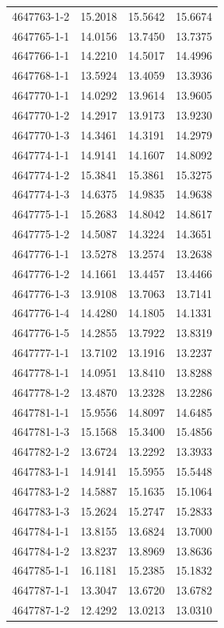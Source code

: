 \begin{longtable}{lrrr}
4647763-1-2 & 15.2018 & 15.5642 & 15.6674 \\
4647765-1-1 & 14.0156 & 13.7450 & 13.7375 \\
4647766-1-1 & 14.2210 & 14.5017 & 14.4996 \\
4647768-1-1 & 13.5924 & 13.4059 & 13.3936 \\
4647770-1-1 & 14.0292 & 13.9614 & 13.9605 \\
4647770-1-2 & 14.2917 & 13.9173 & 13.9230 \\
4647770-1-3 & 14.3461 & 14.3191 & 14.2979 \\
4647774-1-1 & 14.9141 & 14.1607 & 14.8092 \\
4647774-1-2 & 15.3841 & 15.3861 & 15.3275 \\
4647774-1-3 & 14.6375 & 14.9835 & 14.9638 \\
4647775-1-1 & 15.2683 & 14.8042 & 14.8617 \\
4647775-1-2 & 14.5087 & 14.3224 & 14.3651 \\
4647776-1-1 & 13.5278 & 13.2574 & 13.2638 \\
4647776-1-2 & 14.1661 & 13.4457 & 13.4466 \\
4647776-1-3 & 13.9108 & 13.7063 & 13.7141 \\
4647776-1-4 & 14.4280 & 14.1805 & 14.1331 \\
4647776-1-5 & 14.2855 & 13.7922 & 13.8319 \\
4647777-1-1 & 13.7102 & 13.1916 & 13.2237 \\
4647778-1-1 & 14.0951 & 13.8410 & 13.8288 \\
4647778-1-2 & 13.4870 & 13.2328 & 13.2286 \\
4647781-1-1 & 15.9556 & 14.8097 & 14.6485 \\
4647781-1-3 & 15.1568 & 15.3400 & 15.4856 \\
4647782-1-2 & 13.6724 & 13.2292 & 13.3933 \\
4647783-1-1 & 14.9141 & 15.5955 & 15.5448 \\
4647783-1-2 & 14.5887 & 15.1635 & 15.1064 \\
4647783-1-3 & 15.2624 & 15.2747 & 15.2833 \\
4647784-1-1 & 13.8155 & 13.6824 & 13.7000 \\
4647784-1-2 & 13.8237 & 13.8969 & 13.8636 \\
4647785-1-1 & 16.1181 & 15.2385 & 15.1832 \\
4647787-1-1 & 13.3047 & 13.6720 & 13.6782 \\
4647787-1-2 & 12.4292 & 13.0213 & 13.0310 \\

\end{longtable}
